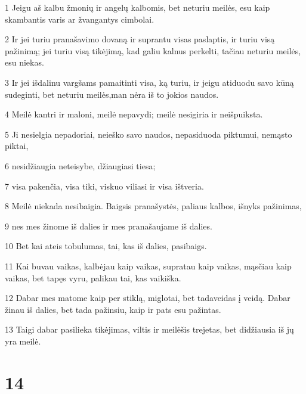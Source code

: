 \par 1 Jeigu aš kalbu žmonių ir angelų kalbomis, bet neturiu meilės, esu kaip skambantis varis ar žvangantys cimbolai. 
\par 2 Ir jei turiu pranašavimo dovaną ir suprantu visas paslaptis, ir turiu visą pažinimą; jei turiu visą tikėjimą, kad galiu kalnus perkelti, tačiau neturiu meilės, esu niekas. 
\par 3 Ir jei išdalinu vargšams pamaitinti visa, ką turiu, ir jeigu atiduodu savo kūną sudeginti, bet neturiu meilės,­man nėra iš to jokios naudos. 
\par 4 Meilė kantri ir maloni, meilė nepavydi; meilė nesigiria ir neišpuiksta. 
\par 5 Ji nesielgia nepadoriai, neieško savo naudos, nepasiduoda piktumui, nemąsto piktai, 
\par 6 nesidžiaugia neteisybe, džiaugiasi tiesa; 
\par 7 visa pakenčia, visa tiki, viskuo viliasi ir visa ištveria. 
\par 8 Meilė niekada nesibaigia. Baigsis pranašystės, paliaus kalbos, išnyks pažinimas, 
\par 9 nes mes žinome iš dalies ir mes pranašaujame iš dalies. 
\par 10 Bet kai ateis tobulumas, tai, kas iš dalies, pasibaigs. 
\par 11 Kai buvau vaikas, kalbėjau kaip vaikas, supratau kaip vaikas, mąsčiau kaip vaikas, bet tapęs vyru, palikau tai, kas vaikiška. 
\par 12 Dabar mes matome kaip per stiklą, miglotai, bet tada­veidas į veidą. Dabar žinau iš dalies, bet tada pažinsiu, kaip ir pats esu pažintas. 
\par 13 Taigi dabar pasilieka tikėjimas, viltis ir meilė­šis trejetas, bet didžiausia iš jų yra meilė.


\chapter{14}


